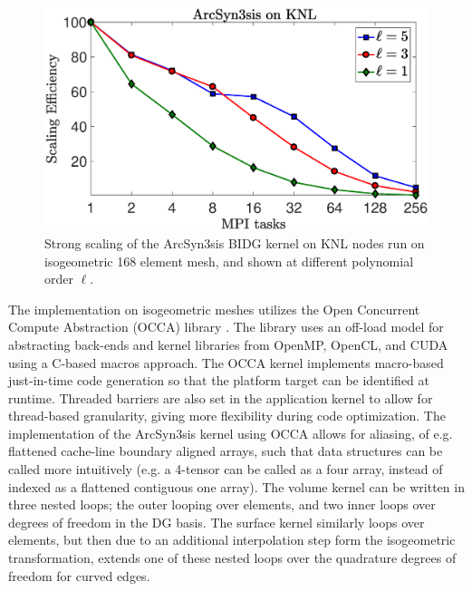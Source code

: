 \begin{figure}
\begin{center}
\includegraphics[width=0.99\linewidth]{./bidg_data/2nd_try/scaling}
\end{center}
\vspace*{-.5cm}
\caption{Strong scaling of the ArcSyn3sis BIDG kernel on KNL nodes run on
isogeometric 168 element mesh, and shown at different polynomial order $\ell$.}
\label{fig:bidg_scaling}
\end{figure}

The implementation on isogeometric meshes utilizes the Open Concurrent Compute
Abstraction (OCCA) library \cite{MedinaPress}.  The library uses an off-load
model for abstracting back-ends and kernel libraries from OpenMP, OpenCL, and
CUDA using a C-based macros approach.  The OCCA kernel implements macro-based
just-in-time code generation so that the platform target can be identified at
runtime.  Threaded barriers are also set in the application kernel to allow for
thread-based granularity, giving more flexibility during code optimization.
The implementation of the ArcSyn3sis kernel using OCCA allows for aliasing, of
e.g. flattened cache-line boundary aligned arrays, such that data structures
can be called more intuitively (e.g. a 4-tensor can be called as a four array,
instead of indexed as a flattened contiguous one array).  The volume kernel can
be written in three nested loops; the outer looping over elements, and two
inner loops over degrees of freedom in the DG basis.  The surface kernel
similarly loops over elements, but then due to an additional interpolation step
form the isogeometric transformation, extends one of these nested loops over
the quadrature degrees of freedom for curved edges.

